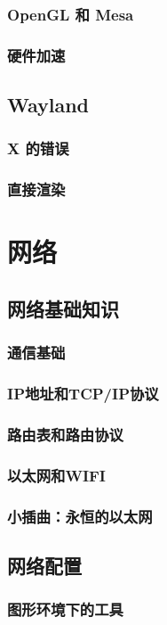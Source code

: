 \documentclass[amstex,twoside]{ctexbook}
\begin{document}
\subsection{  OpenGL 和 Mesa	}
\subsection{  硬件加速	}
\section{  Wayland	}
\subsection{ X 的错误	}
\subsection{  直接渲染}

\chapter{网络}\label{chap:network}
\section{  网络基础知识}
\subsection{  通信基础}
\subsection{  IP地址和TCP/IP协议}
\subsection{  路由表和路由协议}
\subsection{ 以太网和WIFI}
\subsection*{  小插曲：永恒的以太网}

\section{网络配置\label{sec:ifconfig}}
\subsection{  图形环境下的工具	}
\end{document}
